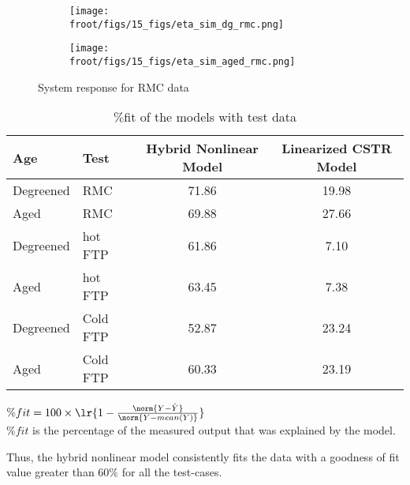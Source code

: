 \begin{figure}[H]
        \begin{minipage}{0.49\textwidth}
                \begin{figure}[H]
                        \centering
                        \texttt{[image: \\froot/figs/15\_figs/eta\_sim\_dg\_rmc.png]}
                \end{figure}
        \end{minipage}
        \begin{minipage}{0.49\textwidth}
                \begin{figure}[H]
                        \centering
                        \texttt{[image: \\froot/figs/15\_figs/eta\_sim\_aged\_rmc.png]}
                \end{figure}
        \end{minipage}
        \caption{System response for RMC data}
\end{figure}


\begin{table}[H]
        \centering
        \caption{$\%$fit of the models with test data}
        \begin{tabular}{l l c c}
                \hline \hline
                Age & Test & Hybrid Nonlinear Model & Linearized CSTR Model \\ \hline \hline
                Degreened & RMC & 71.86 & 19.98 \\
                Aged      & RMC & 69.88 & 27.66 \\ \hline
                Degreened & hot FTP & 61.86 & 7.10 \\
                Aged      & hot FTP & 63.45 & 7.38 \\ \hline
                Degreened & Cold FTP & 52.87 & 23.24 \\
                Aged      & Cold FTP & 60.33 & 23.19 \\ \hline
                \hline
        \end{tabular}

        $\%fit = 100 \times \lr{1 - \frac{\norm{Y- \hat Y}}{\norm{Y -
        mean(Y)}}}$ \\
        $\%fit$ is the percentage of the measured output that was explained by the
        model.
\end{table}

Thus, the hybrid nonlinear model consistently fits the data with a goodness of fit value greater than $60\%$ for all the test-cases.
